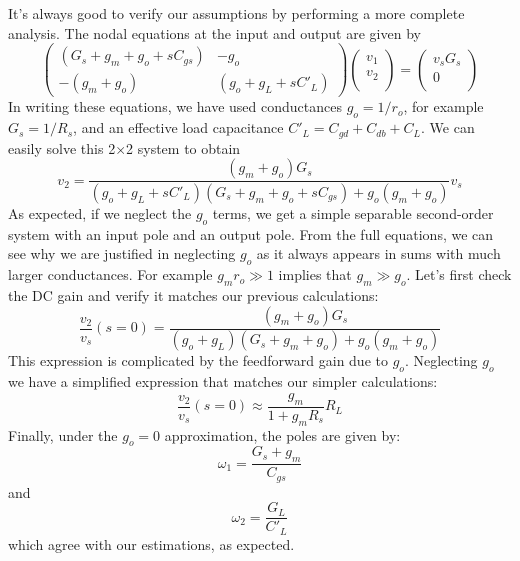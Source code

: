 It's always good to verify our assumptions by performing a more complete analysis.  The nodal equations at the input and output are given by
%
\begin{equation}
	\begin{pmatrix}
	(G_s + g_m + g_o + s C_{gs})  & - g_o \\
	-(g_m + g_o) & (g_o + g_L + s C'_L)
	\end{pmatrix}
	\begin{pmatrix}
	v_1 \\ v_2 \\
	\end{pmatrix}
	=
	\begin{pmatrix}
	v_s G_s \\ 0 \\
	\end{pmatrix}	
\end{equation}
%
In writing these equations, we have used conductances $g_o = 1/r_o$, for example $G_s = 1/R_s$, and an effective load capacitance $C'_L = C_{gd} + C_{db} + C_L$.  We can easily solve this 2$\times$2 system to obtain
%
\begin{equation}
	v_2 = \frac{(g_m + g_o) G_s}
			   {(g_o + g_L + s C'_L)(G_s + g_m + g_o + s C_{gs}) + g_o (g_m + g_o)} v_s
\end{equation}
%
As expected, if we neglect the $g_o$ terms, we get a simple separable second-order system with an input pole and an output pole.  From the full equations, we can see why we are justified in neglecting $g_o$ as it always appears in sums with much larger conductances.  For example $g_m r_o \gg 1$ implies that $g_m \gg g_o$.  Let's first check the DC gain and verify it matches our previous calculations:
%
\begin{equation}
	\frac{v_2}{v_s}(s = 0) = 
		  \frac{(g_m + g_o) G_s}
			   {(g_o + g_L)(G_s + g_m + g_o) + g_o (g_m + g_o)} 
\end{equation}
%
This expression is complicated by the feedforward gain due to $g_o$.  Neglecting $g_o$ we have a simplified expression that matches our simpler calculations:
%
\begin{equation}
	\frac{v_2}{v_s}(s = 0) \approx \frac{g_m}{1 + g_m R_s} R_L 
\end{equation}
%
Finally, under the $g_o = 0$ approximation, the poles are given by:
%
\begin{equation}
	\omega_1 = \frac{G_s + g_m}{C_{gs}}
\end{equation}
%
and
%
\begin{equation}
	\omega_2 = \frac{G_L}{C'_{L}}
\end{equation}
%
which agree with our estimations, as expected.


